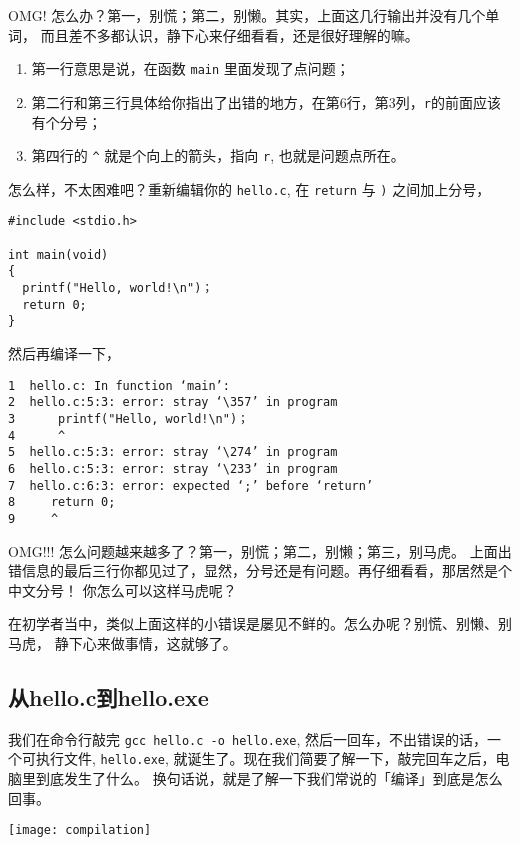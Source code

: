 \documentclass{wx672article}
\begin{document}
OMG! 怎么办？第一，别慌；第二，别懒。其实，上面这几行输出并没有几个单词，
而且差不多都认识，静下心来仔细看看，还是很好理解的嘛。
\begin{enumerate}
\item 第一行意思是说，在函数 \texttt{main} 里面发现了点问题；
\item 第二行和第三行具体给你指出了出错的地方，在第6行，第3列，\texttt{r}的前面应该有个分号；
\item 第四行的 \texttt{\textasciicircum{}} 就是个向上的箭头，指向 \texttt{r}, 也就是问题点所在。
\end{enumerate}

怎么样，不太困难吧？重新编辑你的 \texttt{hello.c}, 在 \texttt{return} 与 \texttt{)} 之间加上分号，

\begin{verbatim}
#include <stdio.h>

int main(void)
{
  printf("Hello, world!\n")；
  return 0;
}
\end{verbatim}

然后再编译一下，
\begin{verbatim}
1  hello.c: In function ‘main’:
2  hello.c:5:3: error: stray ‘\357’ in program
3      printf("Hello, world!\n")；
4      ^
5  hello.c:5:3: error: stray ‘\274’ in program
6  hello.c:5:3: error: stray ‘\233’ in program
7  hello.c:6:3: error: expected ‘;’ before ‘return’
8     return 0;
9     ^
\end{verbatim}

OMG!!! 怎么问题越来越多了？第一，别慌；第二，别懒；第三，别马虎。
上面出错信息的最后三行你都见过了，显然，分号还是有问题。再仔细看看，那居然是个中文分号！
你怎么可以这样马虎呢？

在初学者当中，类似上面这样的小错误是屡见不鲜的。怎么办呢？别慌、别懒、别马虎，
静下心来做事情，这就够了。

\subsection{从hello.c到hello.exe}

我们在命令行敲完 \texttt{gcc hello.c -o hello.exe}, 然后一回车，不出错误的话，一个可执行文件,
\texttt{hello.exe}, 就诞生了。现在我们简要了解一下，敲完回车之后，电脑里到底发生了什么。
换句话说，就是了解一下我们常说的「编译」到底是怎么回事。

\texttt{[image: compilation]}
\end{document}
